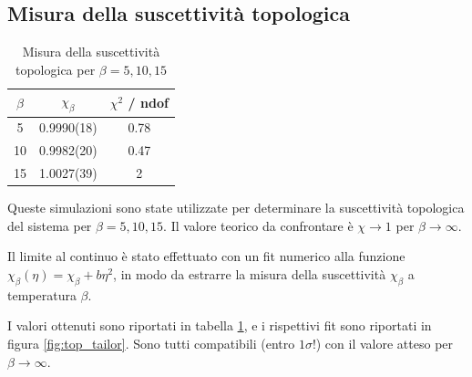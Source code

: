 \documentclass[a4paper,11pt]{article}
\begin{document}
    \subsection{Misura della suscettività topologica}
    
    \begin{table}
        \centering
        \begin{tabular}{c c c} \hline
            $\beta$   & $\chi_\beta$    & $\chi^2$ / ndof \\ \hline
            5      & 0.9990(18)    & 0.78 \\
            10     & 0.9982(20)             & 0.47 \\
            15     & 1.0027(39)             & 2 \\ \hline
            
        \end{tabular} 
        \caption{Misura della suscettività topologica per $\beta = 5, 10, 15$}
        \label{tab:top_tailor}
    \end{table}
    

    Queste simulazioni sono state utilizzate per determinare la suscettività topologica del sistema per $\beta = 5, 10, 15$. Il valore teorico da confrontare è $\chi \to 1$ per $\beta \to \infty$.
    
    Il limite al continuo è stato effettuato con un fit numerico alla funzione $\chi_\beta(\eta) = \chi_\beta + b\eta^2$, in modo da estrarre la misura della suscettività $\chi_\beta$ a temperatura $\beta$.
    
    I valori ottenuti sono riportati in tabella \ref{tab:top_tailor}, e i rispettivi fit sono riportati in figura \ref{fig:top_tailor}. Sono tutti compatibili (entro $1\sigma$!) con il valore atteso per $\beta \to \infty$.
\end{document}
